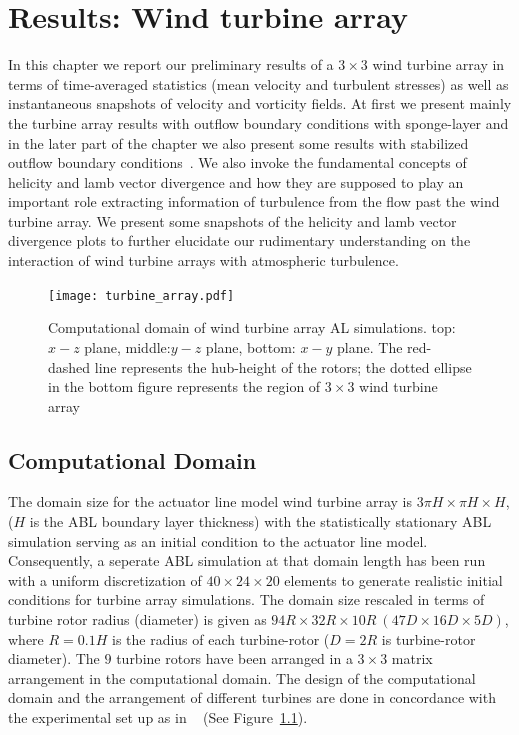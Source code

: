
\chapter{Results: Wind turbine array} %

\label{Chapter4} %
In this chapter we report our preliminary results of a $3\times 3$ wind turbine array in terms of time-averaged statistics (mean velocity and turbulent stresses) as well as instantaneous snapshots of velocity and vorticity fields. At first we present mainly the turbine array results with outflow boundary conditions with sponge-layer and in the later part of the chapter we also present some results with stabilized outflow boundary conditions~\cite{dong,erik}. We also invoke the fundamental concepts of helicity and lamb vector divergence and how they are supposed to play an important role extracting information of turbulence from the flow past the wind turbine array. We  present some snapshots of the helicity and lamb vector divergence plots to further elucidate our rudimentary understanding on the interaction of wind turbine arrays with atmospheric turbulence.
\begin{figure}
\centering
\texttt{[image: turbine\_array.pdf]}\\
 \caption[Computational Domain of Wind turbine array]{Computational domain of wind turbine array AL simulations. top: $x-z$ plane, middle:$y-z$ plane, bottom: $x-y$ plane. The red-dashed line represents the hub-height of the rotors; the dotted ellipse in the bottom figure represents the region of $3\times 3$ wind turbine array}
 \label{f:cord}
\end{figure}
\section{Computational Domain}
The domain size for the actuator line model wind turbine array is $3\pi H\times \pi H\times H$, ($H$ is the ABL boundary layer thickness) with the statistically stationary ABL simulation serving as an initial condition to the actuator line model. Consequently, a seperate ABL simulation at that domain length has been run with a uniform discretization of $40\times 24\times 20$ elements to generate realistic initial conditions for turbine array simulations.  The domain size rescaled in terms of turbine rotor radius (diameter) is given as $94R\times 32R\times 10R \ (47D\times 16D\times 5D) $, where $R = 0.1 H$ is the radius of each turbine-rotor ($D = 2R$ is turbine-rotor diameter). The $9$ turbine rotors have been arranged in a $3\times 3$ matrix arrangement in the computational domain. The design of the  computational domain and the arrangement of different turbines are done in concordance with the experimental set up as in ~\cite{men2,cal3} (See Figure~\ref{f:cord}). 


